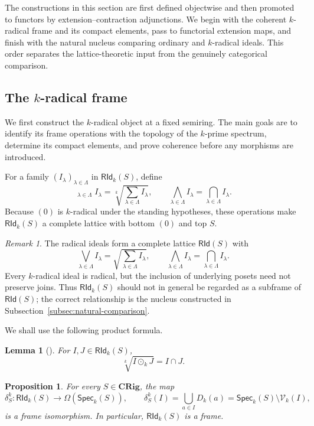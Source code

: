 \documentclass[12pt,leqno]{amsart}
\newcommand{\CRig}{\mathbf{CRig}}
\newcommand{\Speck}{\mathsf{Spec}_{k}}
\newcommand{\RId}{\mathsf{RId}}
\newcommand{\RIdk}{\mathsf{RId}_{k}}
\newtheorem{proposition}[theorem]{Proposition}
\newtheorem{lemma}[theorem]{Lemma}
\theoremstyle{definition}
\numberwithin{equation}{section}
\theoremstyle{remark}
\newtheorem{remark}[theorem]{Remark}
\begin{document}
The constructions in this section are first defined objectwise and then promoted to functors by extension--contraction adjunctions. We begin with the coherent $k$-radical frame and its compact elements, pass to functorial extension maps, and finish with the natural nucleus comparing ordinary and $k$-radical ideals. This order separates the lattice-theoretic input from the genuinely categorical comparison.

\subsection{The \texorpdfstring{$k$}{k}-radical frame}

We first construct the $k$-radical object at a fixed semiring. The main goals are to identify its frame operations with the topology of the $k$-prime spectrum, determine its compact elements, and prove coherence before any morphisms are introduced.

For a family \((I_\lambda)_{\lambda\in\Lambda}\) in \(\RIdk(S)\), define
\[
\mathop{\bigvee_{\!k}}_{\lambda\in\Lambda}I_\lambda
 =\sqrt[k]{\sum_{\lambda\in\Lambda}I_\lambda},
\qquad
\bigwedge_{\lambda\in\Lambda}I_\lambda
 =\bigcap_{\lambda\in\Lambda}I_\lambda.
\]
Because $(0)$ is $k$-radical under the standing hypotheses, these operations make \(\RIdk(S)\) a complete lattice with bottom $(0)$ and top $S$.

\begin{remark}\label{rem:ordinary-radical-frame}
The radical ideals form a complete lattice \(\RId(S)\) with
\[
\bigvee_{\lambda\in\Lambda}I_\lambda
 =\sqrt{\sum_{\lambda\in\Lambda}I_\lambda},
\qquad
\bigwedge_{\lambda\in\Lambda}I_\lambda
 =\bigcap_{\lambda\in\Lambda}I_\lambda.
\]
Every $k$-radical ideal is radical, but the inclusion of underlying posets need not preserve joins. Thus \(\RIdk(S)\) should not in general be regarded as a subframe of \(\RId(S)\); the correct relationship is the nucleus constructed in Subsection~\ref{subsec:natural-comparison}.
\end{remark}

We shall use the following product formula.

\begin{lemma}[{\cite[Lemma~3.9]{AG24}}]\label{lem:k-radical-product}
For \(I,J\in\RIdk(S)\),
\[
\sqrt[k]{I\odot_k J}=I\cap J.
\]
\end{lemma}

\begin{proposition}\label{prop:k-radical-open-frame}
For every \(S\in\CRig\), the map
\[
\delta^k_S\colon\RIdk(S)\longrightarrow\Omega(\Speck(S)),
\qquad
\delta^k_S(I)=\bigcup_{a\in I}D_k(a)
              =\Speck(S)\setminus\mathcal V_k(I),
\]
is a frame isomorphism. In particular, \(\RIdk(S)\) is a frame.
\end{proposition}
\end{document}
